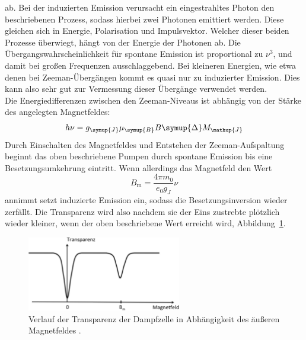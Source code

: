 \documentclass[
  bibliography=totoc,     %
  captions=tableheading,  %
  titlepage=firstiscover, %
]{scrartcl}
\begin{document}
ab. Bei der induzierten Emission verursacht ein eingestrahltes Photon
den beschriebenen Prozess, sodass hierbei zwei Photonen emittiert werden. Diese
gleichen sich in Energie, Polarisation und Impulsvektor. Welcher dieser beiden
Prozesse überwiegt, hängt von der Energie der Photonen ab. Die
Übergangswahrscheinlichkeit für spontane Emission ist proportional zu $\nu^3$,
und damit bei großen Frequenzen ausschlaggebend. Bei kleineren Energien, wie
etwa denen bei Zeeman-Übergängen kommt es quasi nur zu induzierter Emission.
Dies kann also sehr gut zur Vermessung dieser Übergänge verwendet werden. \\
Die Energiedifferenzen zwischen den Zeeman-Niveaus ist abhängig von der Stärke
des angelegten Magnetfeldes:
%
\begin{equation}
  h\nu=g_{\symup{J}}\mu_{\symup{B}}B\symup{\Delta}M_{\mathup{J}}
  \label{eq:übergangsenergie}
\end{equation}
%
Durch Einschalten des Magnetfeldes und Entstehen der Zeeman-Aufspaltung beginnt
das oben beschriebene Pumpen durch spontane Emission bis eine
Besetzungsumkehrung eintritt. Wenn allerdings das Magnetfeld den Wert
%
\begin{equation}
  B_{\mathup{m}}=\frac{4\pi m_0}{e_0g_J}\nu
\end{equation}
%
annimmt setzt induzierte Emission ein, sodass die Besetzungsinversion wieder
zerfällt. Die Transparenz wird also nachdem sie der Eins zustrebte plötzlich
wieder kleiner, wenn der oben beschriebene Wert erreicht wird, Abbildung~\ref{fig:transparenz_b}.
%
\begin{figure}[htb]
  \centering
  \includegraphics[width=0.6\textwidth]{transparenzkurve.pdf}
  \caption{Verlauf der Transparenz der Dampfzelle in Abhängigkeit des äußeren Magnetfeldes \cite{anleitung}.}
  \label{fig:transparenz_b}
\end{figure}
%
\end{document}
